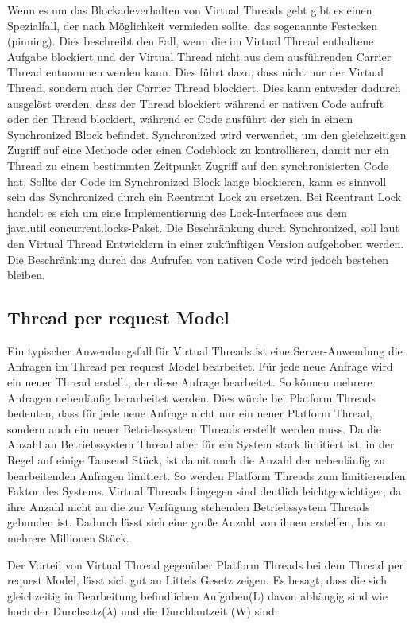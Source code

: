 \documentclass[fontsize=12pt,paper=a4,twoside=semi,parskip=half-,headsepline,headinclude]{scrreprt}
\begin{document}
Wenn es um das Blockadeverhalten von Virtual Threads geht gibt es einen Spezialfall, der nach Möglichkeit vermieden sollte, das sogenannte Festecken (pinning). Dies beschreibt den Fall, wenn die im Virtual Thread enthaltene Aufgabe blockiert und der Virtual Thread nicht aus dem ausführenden Carrier Thread entnommen werden kann. Dies führt dazu, dass nicht nur der Virtual Thread, sondern auch der Carrier Thread blockiert. Dies kann entweder dadurch ausgelöst werden, dass der Thread blockiert während er nativen Code aufruft oder der Thread blockiert, während er Code ausführt der sich in einem Synchronized Block befindet. Synchronized wird verwendet, um den gleichzeitigen Zugriff auf eine Methode oder einen Codeblock zu kontrollieren, damit nur ein Thread zu einem bestimmten Zeitpunkt Zugriff auf den synchronisierten Code hat. Sollte der Code im Synchronized Block lange blockieren, kann es sinnvoll sein das Synchronized durch ein Reentrant Lock zu ersetzen. Bei Reentrant Lock handelt es sich um eine Implementierung des Lock-Interfaces aus dem java.util.concurrent.locks-Paket. Die Beschränkung durch Synchronized, soll laut den Virtual Thread Entwicklern in einer zukünftigen Version aufgehoben werden. Die Beschränkung durch das Aufrufen von nativen Code wird jedoch bestehen bleiben.\cite{Bateman2024}

\subsection{Thread per request Model}

Ein typischer Anwendungsfall für Virtual Threads ist eine Server-Anwendung die Anfragen im Thread per request Model bearbeitet. Für jede neue Anfrage wird ein neuer Thread erstellt, der diese Anfrage bearbeitet. So können mehrere Anfragen nebenläufig berarbeitet werden. Dies würde bei Platform Threads bedeuten, dass für jede neue Anfrage nicht nur ein neuer Platform Thread, sondern auch ein neuer Betriebssystem Threads erstellt werden muss. Da die Anzahl an Betriebssystem Thread aber für ein System stark limitiert ist, in der Regel auf einige Tausend Stück, ist damit auch die Anzahl der nebenläufig zu bearbeitenden Anfragen limitiert. So werden Platform Threads zum limitierenden Faktor des Systems. Virtual Threads hingegen sind deutlich leichtgewichtiger, da ihre Anzahl nicht an die zur Verfügung stehenden Betriebssystem Threads gebunden ist. Dadurch lässt sich eine große Anzahl von ihnen erstellen, bis zu mehrere Millionen Stück.

Der Vorteil von Virtual Thread gegenüber Platform Threads bei dem Thread per request Model, lässt sich gut an Littels Gesetz zeigen. Es besagt, dass die sich gleichzeitig in Bearbeitung befindlichen Aufgaben(L) davon abhängig sind wie hoch der Durchsatz($\lambda$) und die Durchlautzeit (W) sind.\cite{Little_1961}
\end{document}

